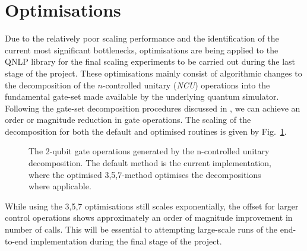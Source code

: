 \section{Optimisations}
\label{sec:optimisations}
Due to the relatively poor scaling performance and the identification of the current most significant bottlenecks, optimisations are being applied to the QNLP library for the final scaling experiments to be carried out during the last stage of the project. These optimisations mainly consist of algorithmic changes to the decomposition of the $n$-controlled unitary (\textit{NCU}) operations into the fundamental gate-set made available by the underlying quantum simulator. Following the gate-set decomposition procedures discussed in \cite{Barenco_1995}, we can achieve an order or magnitude reduction in gate operations. The scaling of the decomposition for both the default and optimised routines is given by Fig.~\ref{fig:ncu_opt}.


\begin{figure}[!h]
\centering
{}
\caption{The 2-qubit gate operations generated by the n-controlled unitary decomposition. The default method is the current implementation, where the optimised {3,5,7}-method optimises the decompositions where applicable.}
\label{fig:ncu_opt}
\end{figure}

While using the 3,5,7 optimisations still scales exponentially, the offset for larger control operations shows approximately an order of magnitude improvement in number of calls. This will be essential to attempting large-scale runs of the end-to-end implementation during the final stage of the project.
